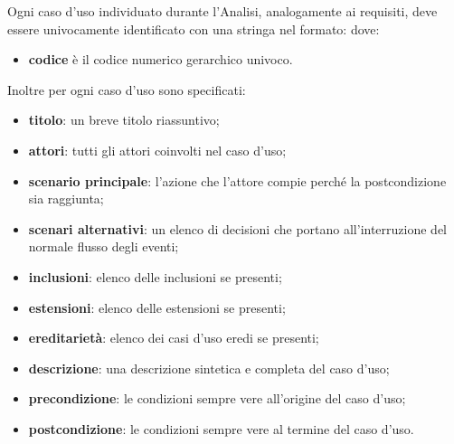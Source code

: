 \documentclass[a4paper, titlepage]{article}
\begin{document}
Ogni caso d'uso individuato durante l'Analisi, analogamente ai requisiti, deve essere univocamente identificato con una stringa nel formato:
dove:
\begin{itemize}
\item \textbf{codice} è il codice numerico gerarchico univoco.
\end{itemize}

Inoltre per ogni caso d'uso sono specificati:
\begin{itemize}
\item \textbf{titolo}: un breve titolo riassuntivo;
\item \textbf{attori}: tutti gli attori coinvolti nel caso d'uso;
\item \textbf{scenario principale}: l'azione che l'attore compie perché la postcondizione sia raggiunta;
\item \textbf{scenari alternativi}: un elenco di decisioni che portano all'interruzione del normale flusso degli eventi;
\item \textbf{inclusioni}: elenco delle inclusioni se presenti;
\item \textbf{estensioni}: elenco delle estensioni se presenti;
\item \textbf{ereditarietà}: elenco dei casi d'uso eredi se presenti;
\item \textbf{descrizione}: una descrizione sintetica e completa del caso d'uso;
\item \textbf{precondizione}: le condizioni sempre vere all'origine del caso d'uso;
\item \textbf{postcondizione}: le condizioni sempre vere al termine del caso d'uso.
\end{itemize}
\end{document}
